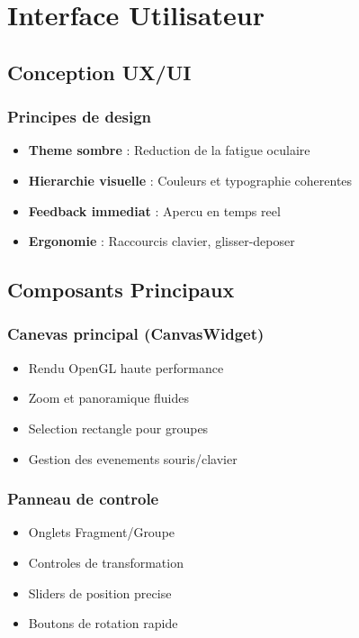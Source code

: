 \documentclass[12pt,a4paper]{article}
\begin{document}
\section{Interface Utilisateur}

\subsection{Conception UX/UI}

\subsubsection{Principes de design}
\begin{itemize}
\item \textbf{Theme sombre} : Reduction de la fatigue oculaire
\item \textbf{Hierarchie visuelle} : Couleurs et typographie coherentes
\item \textbf{Feedback immediat} : Apercu en temps reel
\item \textbf{Ergonomie} : Raccourcis clavier, glisser-deposer
\end{itemize}

\subsection{Composants Principaux}

\subsubsection{Canevas principal (CanvasWidget)}
\begin{itemize}
\item Rendu OpenGL haute performance
\item Zoom et panoramique fluides
\item Selection rectangle pour groupes
\item Gestion des evenements souris/clavier
\end{itemize}

\subsubsection{Panneau de controle}
\begin{itemize}
\item Onglets Fragment/Groupe
\item Controles de transformation
\item Sliders de position precise
\item Boutons de rotation rapide
\end{itemize}
\end{document}
